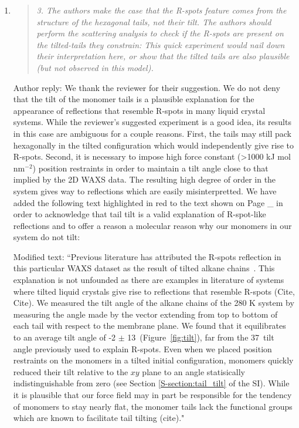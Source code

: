 \documentclass{article}
\begin{document}
\begin{enumerate}
    \item \begin{quote}
    \textit{3. The authors make the case that the R-spots feature comes from the structure of the hexagonal
    tails, not their tilt. The authors should perform the scattering analysis to check if the R-spots are
    present on the tilted-tails they constrain: This quick experiment would nail down their interpretation
    here, or show that the tilted tails are also plausible (but not observed in this model).}
    \end{quote}

    Author reply: We thank the reviewer for their suggestion. We do not deny
    that the tilt of the monomer tails is a plausible explanation for the
    appearance of reflections that resemble R-spots in many liquid crystal systems.
    While the reviewer's suggested experiment is a good idea, its results in this
    case are ambiguous for a couple reasons. First, the tails may still pack
    hexagonally in the tilted configuration which would independently give rise to
    R-spots. Second, it is necessary to impose high force constant (>1000 kJ mol
    nm$^{-2}$) position restraints in order to maintain a tilt angle close to that
    implied by the 2D WAXS data. The resulting high degree of order in the system 
    gives way to reflections which are easily misinterpretted. We have added the
    following text highlighted in red to the text shown on Page \_ in order to
    acknowledge that tail tilt is a valid explanation of R-spot-like reflections 
    and to offer a reason a molecular reason why our monomers in our system do not
    tilt: 
 
    Modified text: ``Previous literature has attributed the R-spots reflection
    in this particular WAXS dataset as the result of tilted alkane
    chains~\cite{feng_scalable_2014}. {\color{red} This explanation is not
    unfounded as there are examples in literature of systems where tilted liquid
    crystals give rise to reflections that resemble R-spots (Cite, Cite).} We
    measured the tilt angle of the alkane chains of the 280 K system by measuring
    the angle made by the vector extending from top to bottom of each tail with
    respect to the membrane plane.  We found that it equilibrates to an average
    tilt angle of -2 $\pm$ 13\degree~(Figure~\ref{fig:tilt}), far from the
    37\degree~tilt angle previously used to explain R-spots. Even when we placed
    position restraints on the monomers in a tilted initial configuration, monomers
    quickly reduced their tilt relative to the $xy$ plane to an angle statisically
    indistinguishable from zero (see Section \ref{S-section:tail_tilt} of the SI).
    {\color{red} While it is plausible that our force field may in part be
    responsible for the tendency of monomers to stay nearly flat, the monomer tails
    lack the functional groups which are known to facilitate tail tilting (cite).}"


\end{enumerate}
\end{document}

